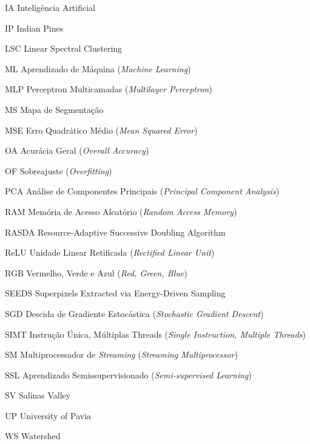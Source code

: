 \begin{siglas}
    \item[IA]    Inteligência Artificial
    \item[IP]    Indian Pines
    \item[LSC]   Linear Spectral Clustering
    \item[ML]    Aprendizado de Máquina (\textit{Machine Learning})
    \item[MLP]   Perceptron Multicamadas (\textit{Multilayer Perceptron})
    \item[MS]    Mapa de Segmentação
    \item[MSE]   Erro Quadrático Médio (\textit{Mean Squared Error})
    \item[OA]    Acurácia Geral (\textit{Overall Accuracy})
    \item[OF]    Sobreajuste (\textit{Overfitting})
    \item[PCA]   Análise de Componentes Principais (\textit{Principal Component Analysis})
    \item[RAM]   Memória de Acesso Aleatório (\textit{Random Access Memory})
    \item[RASDA] Resource-Adaptive Successive Doubling Algorithm
    \item[ReLU]  Unidade Linear Retificada (\textit{Rectified Linear Unit})
    \item[RGB]   Vermelho, Verde e Azul (\textit{Red, Green, Blue})
    \item[SEEDS] Superpixels Extracted via Energy-Driven Sampling
    \item[SGD]   Descida de Gradiente Estocástica (\textit{Stochastic Gradient Descent})
    \item[SIMT]  Instrução Única, Múltiplas Threads (\textit{Single Instruction, Multiple Threads})
    \item[SM]    Multiprocessador de \textit{Streaming} (\textit{Streaming Multiprocessor})
    \item[SSL]   Aprendizado Semissupervisionado (\textit{Semi-supervised Learning})
    \item[SV]    Salinas Valley
    \item[UP]    University of Pavia
    \item[WS]    Watershed
\end{siglas}

